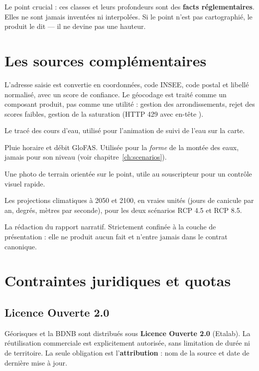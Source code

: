 Le point crucial : ces classes et leurs profondeurs sont des \textbf{facts
réglementaires}. Elles ne sont jamais inventées ni interpolées. Si le point
n'est pas cartographié, le produit le dit — il ne devine pas une hauteur.

\section{Les sources complémentaires}

\begin{description}[leftmargin=0em,style=nextline]
  \item[Géocodage — Géoplateforme (IGN).] L'adresse saisie est convertie en
  coordonnées, code INSEE, code postal et libellé normalisé, avec un score de
  confiance. Le géocodage est traité comme un composant produit, pas comme une
  utilité : gestion des arrondissements, rejet des scores faibles, gestion de
  la saturation (HTTP 429 avec en-tête ).
  \item[Hydrographie — Sandre.] Le tracé des cours d'eau, utilisé pour
  l'animation de suivi de l'eau sur la carte.
  \item[Météo — Open-Meteo.] Pluie horaire et débit GloFAS. Utilisée pour la
  \emph{forme} de la montée des eaux, jamais pour son niveau
  (voir chapitre~\ref{ch:scenarios}).
  \item[Photographie — Panoramax.] Une photo de terrain orientée sur le point,
  utile au souscripteur pour un contrôle visuel rapide.
  \item[Copernicus CDS.] Les projections climatiques à 2050 et 2100, en vraies
  unités (jours de canicule par an, degrés, mètres par seconde), pour les deux
  scénarios RCP 4.5 et RCP 8.5.
  \item[Mistral.] La rédaction du rapport narratif. Strictement confinée à la
  couche de présentation : elle ne produit aucun fait et n'entre jamais dans
  le contrat canonique.
\end{description}

\section{Contraintes juridiques et quotas}

\subsection{Licence Ouverte 2.0}

Géorisques et la BDNB sont distribués sous \textbf{Licence Ouverte 2.0}
(Etalab). La réutilisation commerciale est explicitement autorisée, sans
limitation de durée ni de territoire. La seule obligation est
l'\textbf{attribution} : nom de la source et date de dernière mise à jour.


